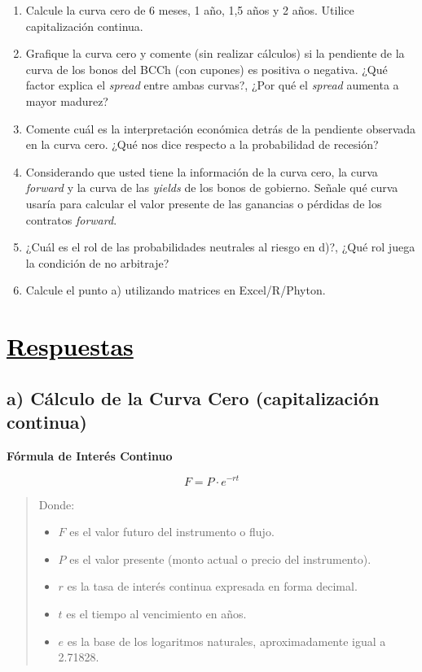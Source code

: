 \documentclass[12pt]{article}
\newcommand{\subrayadoRojo}[1]{{\color{rojoudp}\underline{\textcolor{black}{#1}}}}
\newcommand{\formulasection}[2]{%
    \vspace{1em}
    \noindent
    {\large\bfseries\color{blue}#1}\\[-4em]
    \begin{center}
        \large
      \[
      #2
      \]
    \end{center}
    \vspace{1em}
}
\begin{document}
\begin{enumerate}[label=\textbf{\alph*)}]
    \item Calcule la curva cero de 6 meses, 1 año, 1,5 años y 2 años.
     Utilice capitalización continua.
    
    \item Grafique la curva cero y comente (sin realizar cálculos) si 
    la pendiente de la curva de los bonos del BCCh (con cupones) es 
    positiva o negativa. ¿Qué factor explica el \textit{spread} entre 
    ambas curvas?, ¿Por qué el \textit{spread} aumenta a mayor madurez?
    
    \item Comente cuál es la interpretación económica detrás de la 
    pendiente observada en la curva cero. ¿Qué nos dice respecto a 
    la probabilidad de recesión?
    
    \item Considerando que usted tiene la información de la curva cero, 
    la curva \textit{forward} y la curva de las \textit{yields} de los 
    bonos de gobierno. Señale qué curva usaría para calcular el valor 
    presente de las ganancias o pérdidas de los contratos \textit{forward}.
    
    \item ¿Cuál es el rol de las probabilidades neutrales al riesgo en d)?, 
    ¿Qué rol juega la condición de no arbitraje?
    
    \item Calcule el punto a) utilizando matrices en Excel/R/Phyton.
\end{enumerate}

\newpage

\section*{\subrayadoRojo{Respuestas}}

\subsection*{a) Cálculo de la Curva Cero (capitalización continua)}

\formulasection{Fórmula de Interés Continuo}{
    F = P \cdot e^{-rt}
}
\vspace{-3em}
\begin{quote}
    \scriptsize
Donde:
\begin{itemize}
    \item $F$ es el valor futuro del instrumento o flujo.
    \item $P$ es el valor presente (monto actual o precio del instrumento).
    \item $r$ es la tasa de interés continua expresada en forma decimal.
    \item $t$ es el tiempo al vencimiento en años.
    \item $e$ es la base de los logaritmos naturales, aproximadamente igual a 2.71828.
\end{itemize}
\end{quote}
\end{document}
